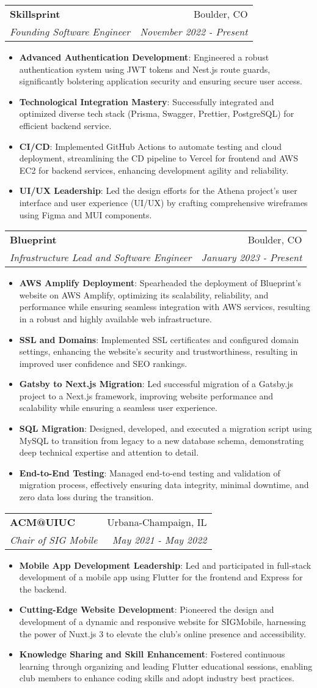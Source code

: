 \documentclass[letterpaper,11pt]{article}
\makeatletter
\newcommand{\resumeItem}[2]{
  \item\small{
    \textbf{#1}{: #2 \vspace{-2pt}}
  }
}
\newcommand{\resumeSubheading}[4]{
  \vspace{-1pt}\item
    \begin{tabular*}{0.97\textwidth}[t]{l@{\extracolsep{\fill}}r}
      \textbf{#1} & #2\vspace{-2pt} \\
      \textit{\small#3} & \textit{\small #4} \\
    \end{tabular*}\vspace{-8pt}
}
\newcommand{\resumeItemListStart}{\begin{itemize}}
\newcommand{\resumeItemListEnd}{\end{itemize}\vspace{-8pt}}
\makeatother
\begin{document}
\resumeSubheading
{Skillsprint}{Boulder, CO}
{Founding Software Engineer}{November 2022 - Present}
\resumeItemListStart
\resumeItem{Advanced Authentication Development}
{Engineered a robust authentication system using JWT tokens and Nest.js route guards, significantly bolstering application security and ensuring secure user access.}
\resumeItem{Technological Integration Mastery}
{Successfully integrated and optimized diverse tech stack (Prisma, Swagger, Prettier, PostgreSQL) for efficient backend service.}
\resumeItem{CI/CD}
{Implemented GitHub Actions to automate testing and cloud deployment, streamlining the CD pipeline to Vercel for frontend and AWS EC2 for backend services, enhancing development agility and reliability.}
\resumeItem{UI/UX Leadership}
{Led the design efforts for the Athena project's user interface and user experience (UI/UX) by crafting comprehensive wireframes using Figma and MUI components.}
\resumeItemListEnd

\resumeSubheading
{Blueprint}{Boulder, CO}
{Infrastructure Lead and Software Engineer}{January 2023 - Present}
\resumeItemListStart
\resumeItem{AWS Amplify Deployment}
{Spearheaded the deployment of Blueprint's website on AWS Amplify, optimizing its scalability, reliability, and performance while ensuring seamless integration with AWS services, resulting in a robust and highly available web infrastructure.}
\resumeItem{SSL and Domains}
{Implemented SSL certificates and configured domain settings, enhancing the website's security and trustworthiness, resulting in improved user confidence and SEO rankings.}
\resumeItem{Gatsby to Next.js Migration}
{Led successful migration of a Gatsby.js project to a Next.js framework, improving website performance and scalability while ensuring a seamless user experience.}
\resumeItem{SQL Migration}
{Designed, developed, and executed a migration script using MySQL to transition from legacy to a new database schema, demonstrating deep technical expertise and attention to detail.}
\resumeItem{End-to-End Testing}
{Managed end-to-end testing and validation of migration process, effectively ensuring data integrity, minimal downtime, and zero data loss during the transition.}
\resumeItemListEnd

\resumeSubheading
{ACM@UIUC}{Urbana-Champaign, IL}
{Chair of SIG Mobile}{May 2021 - May 2022}
\resumeItemListStart
\resumeItem{Mobile App Development Leadership}
{Led and participated in full-stack development of a mobile app using Flutter for the frontend and Express for the backend.}
\resumeItem{Cutting-Edge Website Development}
{Pioneered the design and development of a dynamic and responsive website for SIGMobile, harnessing the power of Nuxt.js 3 to elevate the club's online presence and accessibility.}
\resumeItem{Knowledge Sharing and Skill Enhancement}
{Fostered continuous learning through organizing and leading Flutter educational sessions, enabling club members to enhance coding skills and adopt industry best practices.}
\resumeItemListEnd
\end{document}
